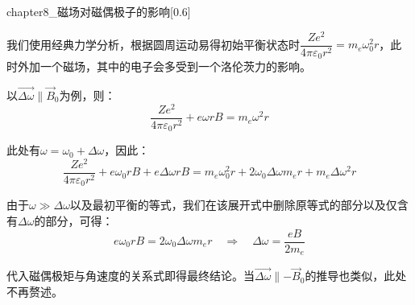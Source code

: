 \begin{prove}[外加磁场对磁偶极子的影响]
    \begin{singlefigure}[磁场对磁偶极子的影响]{chapter8_磁场对磁偶极子的影响}[0.6]
    \end{singlefigure}
    我们使用经典力学分析，根据圆周运动易得初始平衡状态时$\dfrac{Ze^2}{4\pi\varepsilon_0 r^2}=m_e\omega_0^2 r$，此时外加一个磁场，其中的电子会多受到一个洛伦茨力的影响。

    以$\vec{\Delta \omega}\parallel\vec{B}_0$为例，则：
    \[\dfrac{Ze^2}{4\pi\varepsilon_0 r^2} + e\omega r B = m_e\omega^2 r\]

    此处有$\omega = \omega_0 + \Delta \omega$，因此：
    \[\dfrac{Ze^2}{4\pi\varepsilon_0 r^2} + e\omega_0 r B + e\Delta\omega r B = m_e\omega_0^2 r + 2\omega_0\Delta\omega m_e r + m_e\Delta\omega^2 r\]

    由于$\omega\gg\Delta\omega$以及最初平衡的等式，我们在该展开式中删除原等式的部分以及仅含有$\Delta\omega$的部分，可得：
    \[e\omega_0 r B = 2\omega_0\Delta\omega m_e r\quad\Rightarrow\quad \Delta\omega = \dfrac{eB}{2m_e}\]

    代入磁偶极矩与角速度的关系式即得最终结论。当$\vec{\Delta \omega}\parallel -\vec{B}_0$的推导也类似，此处不再赘述。
\end{prove}

